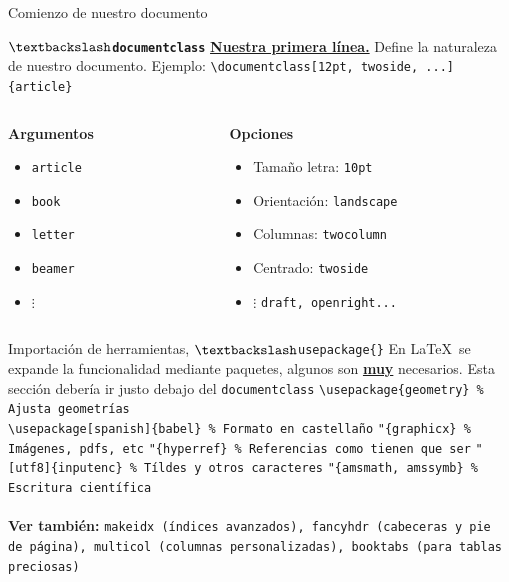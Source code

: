 \documentclass[12pt]{beamer}
\begin{document}
\begin{frame}[fragile]{Comienzo de nuestro documento}
	\begin{block}{\textbf{\texttt{$\textbackslash$documentclass}}}
		\underline{\textbf{Nuestra primera línea.}} Define la naturaleza de nuestro documento. Ejemplo:  \verb|\documentclass[12pt, twoside, ...]{article}|
	\end{block}
	\begin{columns}
		\begin{column}{0.5\textwidth}
			\textbf{Argumentos}
			\begin{itemize}
				\item \texttt{article}
				\item \texttt{book}
				\item \texttt{letter}
				\item \texttt{beamer}
				\item $\vdots$
			\end{itemize}
		\end{column}
		\begin{column}{0.5\textwidth}
			\textbf{Opciones}
			\begin{itemize}
				\item Tamaño letra: \texttt{10pt}
				\item Orientación: \texttt{landscape}
				\item Columnas: \texttt{twocolumn}
				\item Centrado: \texttt{twoside}
				\item $\vdots$ \texttt{draft, openright...}
			\end{itemize}
		\end{column}
	\end{columns}
\end{frame}

\begin{frame}[fragile]{Importación de herramientas, $\textbackslash$\texttt{usepackage\{\}}}
	En \LaTeX\ se expande la funcionalidad mediante paquetes, algunos son \textbf{\underline{muy}} necesarios. Esta sección debería ir justo debajo del \texttt{documentclass}
	\verb|\usepackage{geometry} % Ajusta geometrías| \\
	\verb|\usepackage[spanish]{babel} % Formato en castellaño|
	\verb|"{graphicx} % Imágenes, pdfs, etc|
	\verb|"{hyperref} % Referencias como tienen que ser|
	\verb|"[utf8]{inputenc} % Tíldes y otros caracteres|
	\verb|"{amsmath, amssymb} % Escritura científica| \\
	\hrulefill\\
	\textbf{Ver también:} \texttt{makeidx (índices avanzados), fancyhdr (cabeceras y pie de página), multicol (columnas personalizadas), booktabs (para tablas preciosas)}
\end{frame}
\end{document}
